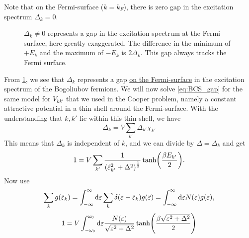 Note that on the Fermi-surface ($k = k_F$), there is zero gap in the excitation spectrum $\Delta_k =0$. 
\begin{figure}
	\centering
	
	\caption{$\Delta_k \ne 0$ represents a gap in the excitation spectrum at the Fermi surface, here greatly exaggerated. The difference in the minimum of $+E_k$ and the maximum of $-E_k$ is $2\Delta_k$. This gap always tracks the Fermi surface. }
	\label{fig:BCS_gap}
\end{figure}
From \cref{fig:BCS_gap}, we see that $\Delta_k$ represents a gap \underline{on the Fermi-surface} in the excitation spectrum of the Bogoliubov fermions.
We will now solve \cref{eq:BCS_gap} for the same model for $V_{kk'}$ that we used in the Cooper problem, namely a constant attractive potential in a thin shell around the Fermi-surface. With the understanding that $k,k'$ lie within this thin shell, we have 
\begin{equation}
	\Delta_k = V\sum_{k'}\Delta_{k'}\chi_{k'}
\end{equation}
This means that $\Delta_k$ is independent of $k$, and we can divide by $\Delta =\Delta_k$ and get
\begin{equation}
	1 = V\sum_{k'}\frac{1}{\left(\tilde{\varepsilon}_{k'}^2+\Delta^2\right)^\frac12}\tanh(\frac{\beta E_{k'}}{2}).
\end{equation}
Now use 
\begin{equation}
\sum_{k}g(\tilde{\varepsilon}_k) = \int_{-\infty}^\infty\dd\varepsilon\sum_k\delta(\varepsilon-\tilde{\varepsilon}_k)g(\tilde{\varepsilon}) = \int_{-\infty}^{\infty}\dd\varepsilon N(\varepsilon)g(\varepsilon),
\end{equation}
\begin{equation}
	1 = V\int_{-\omega_0}^{\omega_0}\dd\varepsilon \frac{N(\varepsilon)}{\sqrt{\varepsilon^2 + \Delta^2}}\tanh(\frac{\beta\sqrt{\varepsilon^2+\Delta^2}}{2})
\end{equation}

